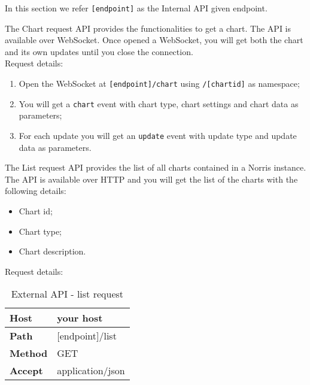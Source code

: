     In this section we refer \texttt{[endpoint]} as the Internal API given endpoint.

        The Chart request API provides the functionalities to get a chart. The API is available over WebSocket. Once opened a WebSocket, you will get both the chart and its own updates until you close the connection. \\
        Request details:
        \begin{enumerate}
            \item Open the WebSocket at \texttt{[endpoint]/chart} using \texttt{/[chartid]} as namespace;
            \item You will get a \texttt{chart} event with chart type, chart settings and chart data as parameters;
            \item For each update you will get an \texttt{update} event with update type and update data as parameters.
        \end{enumerate}

        The List request API provides the list of all charts contained in a Norris instance. The API is available over HTTP and you will get the list of the charts with the following details:
        \begin{itemize}
            \item Chart id;
            \item Chart type;
            \item Chart description.
        \end{itemize}
        Request details:
        \begin{table}[H]
            \centering
            \begin{tabu}{|l|l|}
                \hline
                \textbf{Host} & your host \\ \hline
                \textbf{Path} & [endpoint]/list \\ \hline
                \textbf{Method} & GET \\ \hline
                \textbf{Accept} & application/json \\ \hline
            \end{tabu}
            \caption{External API - list request}
        \end{table}

